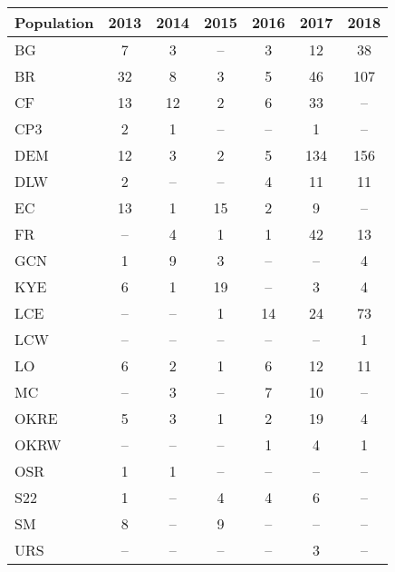 \documentclass[12pt, oneside, titlepage]{article}   	%
\begin{document}
  \label{tab:sigma} 
\begin{table}[ht]
\centering
\begin{tabular}{lcccccc}
  \hline
Population & 2013 & 2014 & 2015 & 2016 & 2017 & 2018 \\ 
  \hline
BG &   7 &   3 & -- &   3 &  12 &  38 \\ 
  BR &  32 &   8 &   3 &   5 &  46 & 107 \\ 
  CF &  13 &  12 &   2 &   6 &  33 & -- \\ 
  CP3 &   2 &   1 & -- & -- &   1 & -- \\ 
  DEM &  12 &   3 &   2 &   5 & 134 & 156 \\ 
  DLW &   2 & -- & -- &   4 &  11 &  11 \\ 
  EC &  13 &   1 &  15 &   2 &   9 & -- \\ 
  FR & -- &   4 &   1 &   1 &  42 &  13 \\ 
  GCN &   1 &   9 &   3 & -- & -- &   4 \\ 
  KYE &   6 &   1 &  19 & -- &   3 &   4 \\ 
  LCE & -- & -- &   1 &  14 &  24 &  73 \\ 
  LCW & -- & -- & -- & -- & -- &   1 \\ 
  LO &   6 &   2 &   1 &   6 &  12 &  11 \\ 
  MC & -- &   3 & -- &   7 &  10 & -- \\ 
  OKRE &   5 &   3 &   1 &   2 &  19 &   4 \\ 
  OKRW & -- & -- & -- &   1 &   4 &   1 \\ 
  OSR &   1 &   1 & -- & -- & -- & -- \\ 
  S22 &   1 & -- &   4 &   4 &   6 & -- \\ 
  SM &   8 & -- &   9 & -- & -- & -- \\ 
  URS & -- & -- & -- & -- &   3 & -- \\ 
     \hline
\end{tabular}
\end{table}

  \newpage
  
  
\end{document}
